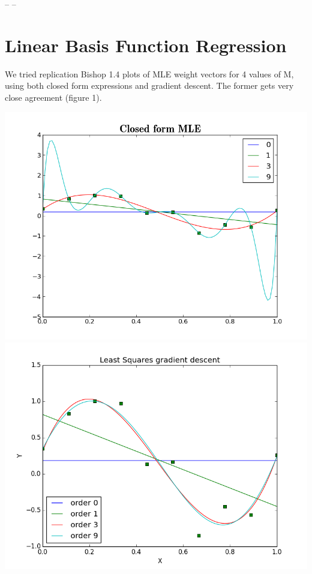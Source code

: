 \documentclass[twoside]{article}
\begin{document}
-- --

\section{Linear Basis Function Regression}

We tried replication Bishop 1.4 plots of MLE weight vectors for 4 values of M, using both closed form expressions and gradient descent. The former gets very close agreement (figure 1).

\begingroup
\centering
\includegraphics[scale=0.17]{./img/pol_reg_regfit.png}
\includegraphics[scale=0.17]{./img/pol_grad_fit.png}
\end{document}

